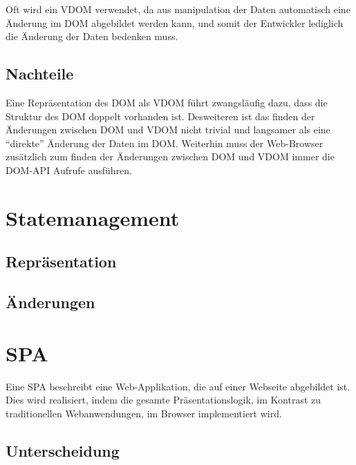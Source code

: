 Oft wird ein \ac{VDOM} verwendet, da aus manipulation der Daten automatisch eine
Änderung im \ac{DOM} abgebildet werden kann, und somit der Entwickler lediglich
die Änderung der Daten bedenken muss.

\subsection{Nachteile}

Eine Repräsentation des \ac{DOM} als \ac{VDOM} führt zwangsläufig dazu, dass die
Struktur des \ac{DOM} doppelt vorhanden ist. Desweiteren ist das finden der
Änderungen zwischen \ac{DOM} und \ac{VDOM} nicht trivial und langsamer als eine
``direkte'' Änderung der Daten im \ac{DOM}. Weiterhin muss der Web-Browser
zusätzlich zum finden der Änderungen zwischen \ac{DOM} und \ac{VDOM} immer
die \ac{DOM}-\ac{API} Aufrufe ausführen.

\section{Statemanagement}
\subsection{Repräsentation}
\subsection{Änderungen}
\section{\acl{SPA}}
Eine \ac{SPA} beschreibt eine Web-Applikation, die auf einer Webseite abgebildet ist. Dies wird realisiert, indem die gesamte Präsentationslogik, im Kontrast zu traditionellen Webanwendungen, im Browser implementiert wird.\cite{SPA} 
\subsection{Unterscheidung}
